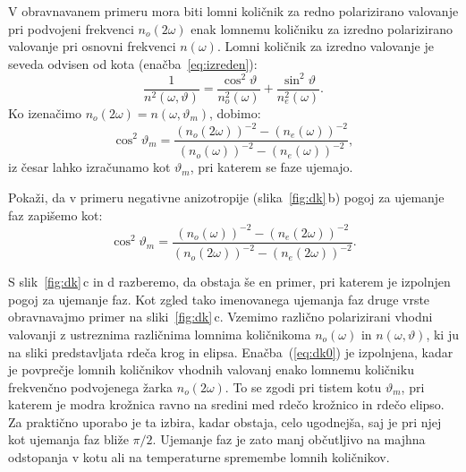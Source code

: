 V obravnavanem primeru mora biti lomni količnik za redno polarizirano valovanje pri 
podvojeni frekvenci $n_o(2\omega)$ enak lomnemu količniku za izredno 
polarizirano valovanje pri osnovni frekvenci $n(\omega)$. Lomni količnik
za izredno valovanje je seveda odvisen od kota (enačba~\ref{eq:izreden}):
\begin{equation}
\frac{1}{n^2(\omega,\vartheta)}=
\frac{\cos^{2}\vartheta}{n_{o}^2(\omega)}+\frac{\sin^{2}\vartheta}{n_{e}^2(\omega)}.
\label{8.12}
\end{equation}
Ko izenačimo $n_o(2\omega) = n(\omega,\vartheta_m)$, dobimo:
\begin{equation}
\cos^{2}\vartheta_m=\frac{(n_o(2\omega))^{-2}-(n_{e}(\omega))^{-2}}
{(n_{o}(\omega))^{-2}-(n_{e}(\omega))^{-2}},
\label{8.13}
\end{equation}
iz česar lahko izračunamo kot $\vartheta_m$, pri katerem se faze ujemajo.
\begin{naloga}
Pokaži, da v primeru negativne anizotropije (slika~\ref{fig:dk}\,b) 
pogoj za ujemanje faz zapišemo kot:
\begin{equation}
\cos^{2}\vartheta_m=\frac{(n_o(\omega))^{-2}-(n_{e}(2\omega))^{-2}}
{(n_{o}(2\omega))^{-2}-(n_{e}(2\omega))^{-2}}.
\label{8.13a}
\end{equation}
\end{naloga}

S slik~\ref{fig:dk}\,c in d razberemo, da obstaja še en primer, pri 
katerem je izpolnjen pogoj za ujemanje faz. Kot zgled tako imenovanega
ujemanja faz druge vrste obravnavajmo primer na sliki~\ref{fig:dk}\,c.
Vzemimo različno polarizirani vhodni valovanji z ustreznima različnima lomnima
količnikoma $n_o(\omega)$ in $n(\omega,\vartheta)$, ki ju na sliki predstavljata
rdeča krog in elipsa.
Enačba~(\ref{eq:dk0}) je izpolnjena, kadar je povprečje lomnih količnikov
vhodnih valovanj  enako lomnemu količniku frekvenčno podvojenega žarka $n_o(2\omega)$. 
To se zgodi pri tistem kotu $\vartheta_m$, pri katerem je modra krožnica ravno na 
sredini med rdečo krožnico in rdečo elipso. Za praktično uporabo je ta izbira, kadar obstaja,
celo ugodnejša, saj je pri njej kot ujemanja faz bliže $\pi/2$. 
Ujemanje faz je zato manj občutljivo na majhna odstopanja v kotu ali na temperaturne
spremembe lomnih količnikov. 


